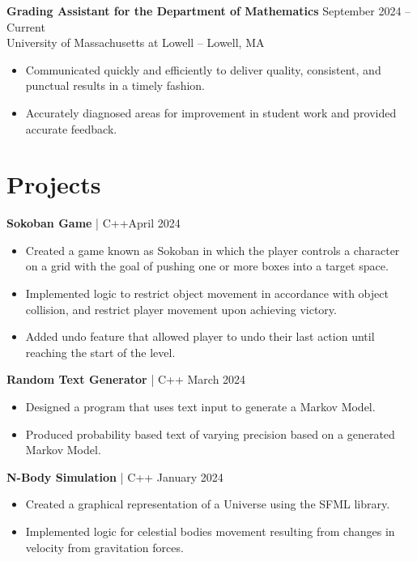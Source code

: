 \documentclass[11pt]{article}       %
\begin{document}
\textbf{Grading Assistant for the Department of Mathematics} \hfill September 2024 -- Current \\
University of Massachusetts at Lowell -- Lowell, MA \\
\vspace{-9pt}
\begin{itemize}
    \item Communicated quickly and efficiently to deliver quality, consistent, and punctual results in a timely fashion.
    \item Accurately diagnosed areas for improvement in student work and provided accurate feedback.
\end{itemize}
\vspace{-18.5pt}

\section*{Projects}

\textbf{Sokoban Game} | C++\hfill April 2024\\
\vspace{-9pt}
\begin{itemize}
  \item Created a game known as Sokoban in which the player controls a character on a grid with the goal of pushing one or more boxes into a target space.
  \item Implemented logic to restrict object movement in accordance with object collision, and restrict player movement upon achieving victory.
  \item Added undo feature that allowed player to undo their last action until reaching the start of the level.
\end{itemize}

\textbf{Random Text Generator} | C++ \hfill March 2024 \\
\vspace{-9pt}
\begin{itemize}
  \item  Designed a program that uses text input to generate a Markov Model.
  \item Produced probability based text of varying precision based on a generated Markov Model.
\end{itemize}

\textbf{N-Body Simulation} | C++ \hfill January 2024 \\
\vspace{-9pt}
\begin{itemize}
  \item Created a graphical representation of a Universe using the SFML library.
  \item Implemented logic for celestial bodies movement resulting from changes in velocity from gravitation forces.
\end{itemize}
\end{document}
